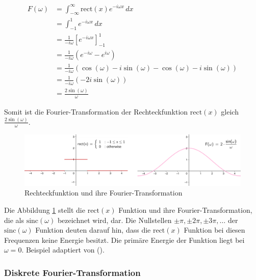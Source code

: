 \documentclass[11pt,a4paper]{article}
\begin{document}
\begin{equation*}
\begin{split}
F(\omega) &= \int_{-\infty}^{\infty} \text{rect}(x) e^{-i \omega x} \, dx \\
&= \int_{-1}^{1} e^{-i \omega x} \, dx \\
&= \frac{1}{-i \omega} \left[ e^{-i \omega x} \right]_{-1}^{1} \\
&= \frac{1}{-i \omega} \left( e^{-i \omega} - e^{i \omega} \right) \\
&= \frac{1}{-i \omega} \left( \cos(\omega) - i \sin(\omega) - \cos(\omega) - i \sin(\omega) \right) \\
&= \frac{1}{-i \omega} \left( -2 i \sin(\omega) \right) \\
&= \frac{2 \sin(\omega)}{\omega}
\end{split}
\end{equation*}
\noindent

\noindent
\newline
Somit ist die Fourier-Transformation der Rechteckfunktion \( \text{rect}(x) \) gleich
\( \displaystyle\frac{2 \sin(\omega)}{\omega} \).

\begin{figure}[h]
    \centering
    \includegraphics[width=0.8\linewidth]{img/example-fourier-trans.png}
    \caption{Rechteckfunktion und ihre Fourier-Transformation}
    \label{fig:fourier_transform}
\end{figure}

\noindent
Die Abbildung \ref{fig:fourier_transform} stellt die \( \text{rect}(x) \) Funktion und ihre 
Fourier-Transformation, die als \( \text{sinc}(\omega) \) bezeichnet wird, dar. Die Nullstellen 
\( \pm \pi, \pm 2 \pi, \pm 3 \pi, \dots \) der \( \text{sinc}(\omega) \) Funktion deuten darauf 
hin, dass die \( \text{rect}(x) \) Funktion bei diesen Frequenzen keine Energie besitzt. Die 
primäre Energie der Funktion liegt bei \( \omega=0 \). Beispiel adaptiert von 
(\cite[Chapter~5 - Example~5.1]{hansen2014fourier}).



\subsubsection{Diskrete Fourier-Transformation}
\end{document}
